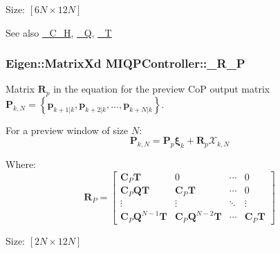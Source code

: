 \-Size\-: $[6N\times12N]$ \begin{DoxySeeAlso}{\-See also}
\hyperlink{classMIQPController_a323718c0eaf8c8a7e159ea7f1ef5b72c}{\-\_\-\-C\-\_\-\-H}, \hyperlink{classMIQPController_ac6404f74d6002d6a0ca4bd2d0b41d548}{\-\_\-\-Q}, \hyperlink{classMIQPController_a1143455ae85d0e221578dbe5d659af1d}{\-\_\-\-T} 
\end{DoxySeeAlso}
\hypertarget{classMIQPController_a7cede44e7827c9b4b12f2549714f3adf}{
\subsubsection[{\-\_\-\-R\-\_\-\-P}]{\setlength{\rightskip}{0pt plus 5cm}\-Eigen\-::\-Matrix\-Xd {\bf \-M\-I\-Q\-P\-Controller\-::\-\_\-\-R\-\_\-\-P}}}\label{classMIQPController_a7cede44e7827c9b4b12f2549714f3adf}
\-Matrix $\mathbf{R}_p$ in the equation for the preview \-Co\-P output matrix $\mathbf{P}_{k,N} = \left\{ \mathbf{p}_{k+1|k}, \mathbf{p}_{k+2|k}, \dots, \mathbf{p}_{k+N|k} \right\}$.

\-For a preview window of size $N$\-: \[ \mathbf{P}_{k,N} = \mathbf{P}_p \mathbf{\xi}_k + \mathbf{R}_p \mathcal{X}_{k,N} \]

\-Where\-: \[ \mathbf{R}_P = \left[\begin{array}{cccc} \mathbf{C}_P\mathbf{T} & 0 & \cdots & 0 \\ \mathbf{C}_P\mathbf{Q}\mathbf{T} & \mathbf{C}_P\mathbf{T} & \cdots & 0 \\ \vdots & \vdots & \ddots & \vdots \\ \mathbf{C}_P\mathbf{Q}^{N-1}\mathbf{T} & \mathbf{C}_P\mathbf{Q}^{N-2}\mathbf{T} & \cdots & \mathbf{C}_P\mathbf{T} \end{array}\right] \]

\-Size\-: $[2N\times12N]$

